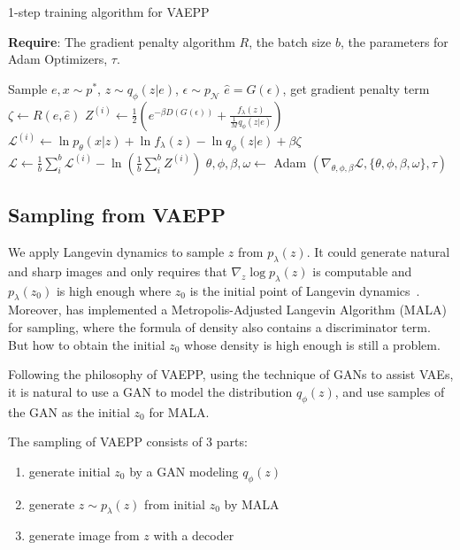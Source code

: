 \begin{algorithm}[tb]
\caption{1-step training algorithm for VAEPP}
\label{alg:improved_vaepp}
\textbf{Require}: The gradient penalty algorithm $R$, the batch size $b$, the parameters for Adam Optimizers, $\tau$. 

\begin{algorithmic}[1] %
\STATE Sample $e, x \sim p^*$, $z \sim q_\phi(z|e)$, $\epsilon \sim p_\mathcal{N}$
\STATE $\hat{e} = G(\epsilon)$, get gradient penalty term $\zeta \gets R(e, \hat{e})$ 
\STATE $Z^{(i)} \gets \frac{1}{2}(e^{-\beta D(G(\epsilon))} + \frac{f_\lambda(z)}{\frac{1}{M} q_\phi(z|e)})$
\STATE $\mathcal{L}^{(i)} \gets \ln p_\theta(x|z) + \ln f_\lambda(z) - \ln q_\phi(z|e) + \beta \zeta$
\ENDFOR
\STATE $\mathcal{L} \gets \frac{1}{b}\sum_{i}^b \mathcal{L}^{(i)} - \ln (\frac{1}{b}\sum_{i}^b Z^{(i)})$
\STATE $\theta, \phi, \beta, \omega \gets $ Adam $(\nabla_{\theta, \phi, \beta} \mathcal{L}, \{\theta, \phi, \beta, \omega\}, \tau)$
\ENDWHILE
\end{algorithmic}
\end{algorithm}

\subsection{Sampling from VAEPP}
We apply Langevin dynamics to sample $z$ from $p_\lambda(z)$. It could generate natural and sharp images and only requires that $\nabla_z \log p_\lambda(z)$ is computable and $p_\lambda(z_0)$ is high enough where $z_0$ is the initial point of Langevin dynamics~\cite{song2019generative}. 
Moreover, \cite{kumar2019maximum} has implemented a Metropolis-Adjusted Langevin Algorithm (MALA) for sampling, where the formula of density also contains a discriminator term. 
But how to obtain the initial $z_0$ whose density is high enough is still a problem. 

Following the philosophy of VAEPP, \IE using the technique of GANs to assist VAEs, it is natural to use a GAN to model the distribution $q_\phi(z)$, and use samples of the GAN as the initial $z_0$ for MALA. 

The sampling of VAEPP consists of 3 parts: 
\begin{enumerate}
	\item generate initial $z_0$ by a GAN modeling $q_\phi(z)$
	\item generate $z \sim p_\lambda(z)$ from initial $z_0$ by MALA
	\item generate image from $z$ with a decoder
\end{enumerate}

